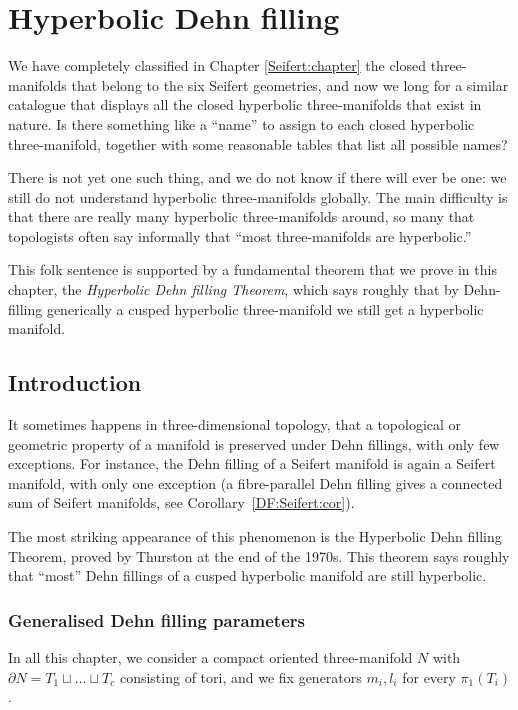 \chapter{Hyperbolic Dehn filling} \label{Hyperbolic:Dehn:chapter}
We have completely classified in Chapter \ref{Seifert:chapter} the closed three-manifolds that belong to the six Seifert geometries, and now we long for a similar catalogue that displays all the closed hyperbolic three-manifolds that exist in nature. Is there something like a ``name'' to assign to each closed hyperbolic three-manifold, together with some reasonable tables that list all possible names?

There is not yet one such thing, and we do not know if there will ever be one: we still do not understand hyperbolic three-manifolds globally. The main difficulty is that there are really many hyperbolic three-manifolds around, so many that topologists often say informally that ``most three-manifolds are hyperbolic.''

This folk sentence is supported by a fundamental theorem that we prove in this chapter, the \emph{Hyperbolic Dehn filling Theorem}, which says roughly that by Dehn-filling generically a cusped hyperbolic three-manifold we still get a hyperbolic manifold.

\section{Introduction}
It sometimes happens in three-dimensional topology, that a topological or geometric property of a manifold is preserved under Dehn fillings, with only few exceptions.
For instance, the Dehn filling of a Seifert manifold is again a Seifert manifold, with only one exception (a fibre-parallel Dehn filling gives a connected sum of Seifert manifolds, see Corollary~\ref{DF:Seifert:cor}).

The most striking appearance of this phenomenon is the Hyperbolic Dehn filling Theorem, proved by Thurston at the end of the 1970s. This theorem says roughly that ``most'' Dehn fillings of a cusped hyperbolic manifold are still hyperbolic.

\subsection{Generalised Dehn filling parameters} \label{generalised:subsection}
In all this chapter, we consider a compact oriented three-manifold $N$ with $\partial N = T_1 \sqcup \ldots \sqcup T_c$ consisting of tori, and we fix generators $m_i,l_i$ for every $\pi_1(T_i)$. 

